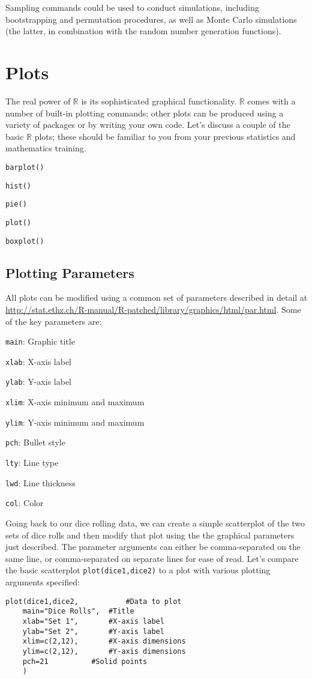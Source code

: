 \documentclass[12pt]{article}
\begin{document}
Sampling commands could be used to conduct simulations, including bootstrapping and permutation procedures, as well as Monte Carlo simulations (the latter, in combination with the random number generation functions).

\section{Plots}\label{sec:plots}
The real power of $\mathbb{R}$ is its sophisticated graphical functionality. $\mathbb{R}$ comes with a number of built-in plotting commands; other plots can be produced using a variety of packages or by writing your own code. Let's discuss a couple of the basic $\mathbb{R}$ plots; these should be familiar to you from your previous statistics and mathematics training.
\begin{itemize*}
\item \verb|barplot()|
\item \verb|hist()|
\item \verb|pie()|
\item \verb|plot()|
\item \verb|boxplot()|
\end{itemize*}

\subsection{Plotting Parameters}
All plots can be modified using a common set of parameters described in detail at \url{http://stat.ethz.ch/R-manual/R-patched/library/graphics/html/par.html}. Some of the key parameters are:
\begin{itemize*}
\item \verb|main|: Graphic title
\item \verb|xlab|: X-axis label
\item \verb|ylab|: Y-axis label
\item \verb|xlim|: X-axis minimum and maximum
\item \verb|ylim|: Y-axis minimum and maximum
\item \verb|pch|: Bullet style
\item \verb|lty|: Line type
\item \verb|lwd|: Line thickness
\item \verb|col|: Color
\end{itemize*}

Going back to our dice rolling data, we can create a simple scatterplot of the two sets of dice rolls and then modify that plot using the the graphical parameters just described. The parameter arguments can either be comma-separated on the same line, or comma-separated on separate lines for ease of read. Let's compare the basic scatterplot \verb|plot(dice1,dice2)| to a plot with various plotting arguments specified:
\begin{verbatim}
plot(dice1,dice2,			#Data to plot
	main="Dice Rolls",	#Title
	xlab="Set 1",		#X-axis label
	ylab="Set 2",		#Y-axis label
	xlim=c(2,12),		#X-axis dimensions
	ylim=c(2,12),		#Y-axis dimensions
	pch=21			#Solid points
	)
\end{verbatim}
\end{document}

